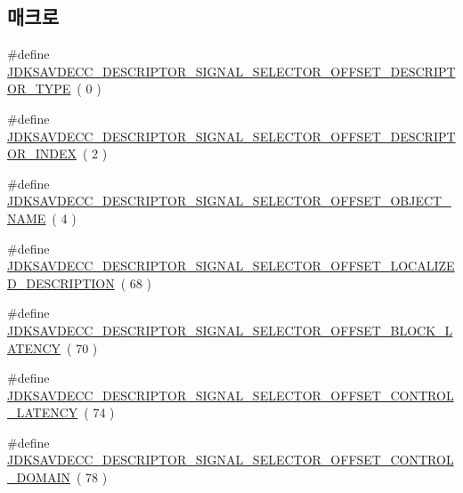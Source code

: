 \subsection*{매크로}
\begin{DoxyCompactItemize}
\item 
\#define \hyperlink{group__descriptor__signal__selector_gac799432e6099ef03a12f77798b17653e}{J\+D\+K\+S\+A\+V\+D\+E\+C\+C\+\_\+\+D\+E\+S\+C\+R\+I\+P\+T\+O\+R\+\_\+\+S\+I\+G\+N\+A\+L\+\_\+\+S\+E\+L\+E\+C\+T\+O\+R\+\_\+\+O\+F\+F\+S\+E\+T\+\_\+\+D\+E\+S\+C\+R\+I\+P\+T\+O\+R\+\_\+\+T\+Y\+PE}~( 0 )
\item 
\#define \hyperlink{group__descriptor__signal__selector_ga4cad296c86f23b50cff487a32a9746c7}{J\+D\+K\+S\+A\+V\+D\+E\+C\+C\+\_\+\+D\+E\+S\+C\+R\+I\+P\+T\+O\+R\+\_\+\+S\+I\+G\+N\+A\+L\+\_\+\+S\+E\+L\+E\+C\+T\+O\+R\+\_\+\+O\+F\+F\+S\+E\+T\+\_\+\+D\+E\+S\+C\+R\+I\+P\+T\+O\+R\+\_\+\+I\+N\+D\+EX}~( 2 )
\item 
\#define \hyperlink{group__descriptor__signal__selector_gaba109c44d40dbca4a9b08cdaec3f5d2a}{J\+D\+K\+S\+A\+V\+D\+E\+C\+C\+\_\+\+D\+E\+S\+C\+R\+I\+P\+T\+O\+R\+\_\+\+S\+I\+G\+N\+A\+L\+\_\+\+S\+E\+L\+E\+C\+T\+O\+R\+\_\+\+O\+F\+F\+S\+E\+T\+\_\+\+O\+B\+J\+E\+C\+T\+\_\+\+N\+A\+ME}~( 4 )
\item 
\#define \hyperlink{group__descriptor__signal__selector_ga98ffddd8b6fac810422a398bce6a68bc}{J\+D\+K\+S\+A\+V\+D\+E\+C\+C\+\_\+\+D\+E\+S\+C\+R\+I\+P\+T\+O\+R\+\_\+\+S\+I\+G\+N\+A\+L\+\_\+\+S\+E\+L\+E\+C\+T\+O\+R\+\_\+\+O\+F\+F\+S\+E\+T\+\_\+\+L\+O\+C\+A\+L\+I\+Z\+E\+D\+\_\+\+D\+E\+S\+C\+R\+I\+P\+T\+I\+ON}~( 68 )
\item 
\#define \hyperlink{group__descriptor__signal__selector_ga8399f8760bd028abdafed66b9e03f344}{J\+D\+K\+S\+A\+V\+D\+E\+C\+C\+\_\+\+D\+E\+S\+C\+R\+I\+P\+T\+O\+R\+\_\+\+S\+I\+G\+N\+A\+L\+\_\+\+S\+E\+L\+E\+C\+T\+O\+R\+\_\+\+O\+F\+F\+S\+E\+T\+\_\+\+B\+L\+O\+C\+K\+\_\+\+L\+A\+T\+E\+N\+CY}~( 70 )
\item 
\#define \hyperlink{group__descriptor__signal__selector_ga93cc882153eb5f30dbb2570abf6e62db}{J\+D\+K\+S\+A\+V\+D\+E\+C\+C\+\_\+\+D\+E\+S\+C\+R\+I\+P\+T\+O\+R\+\_\+\+S\+I\+G\+N\+A\+L\+\_\+\+S\+E\+L\+E\+C\+T\+O\+R\+\_\+\+O\+F\+F\+S\+E\+T\+\_\+\+C\+O\+N\+T\+R\+O\+L\+\_\+\+L\+A\+T\+E\+N\+CY}~( 74 )
\item 
\#define \hyperlink{group__descriptor__signal__selector_gada726da926f2fefcbcdeb36f572ec66e}{J\+D\+K\+S\+A\+V\+D\+E\+C\+C\+\_\+\+D\+E\+S\+C\+R\+I\+P\+T\+O\+R\+\_\+\+S\+I\+G\+N\+A\+L\+\_\+\+S\+E\+L\+E\+C\+T\+O\+R\+\_\+\+O\+F\+F\+S\+E\+T\+\_\+\+C\+O\+N\+T\+R\+O\+L\+\_\+\+D\+O\+M\+A\+IN}~( 78 )

\end{DoxyCompactItemize}
